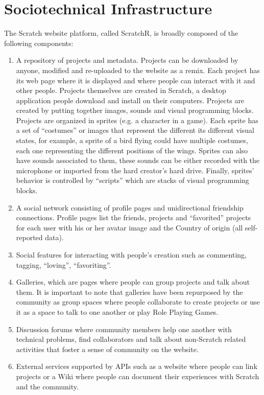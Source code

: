 \section{Sociotechnical Infrastructure}
The Scratch website platform, called ScratchR, is broadly composed of the following components: 

\begin{enumerate}
\item A repository of projects and metadata. Projects can be downloaded by anyone, modified and re-uploaded to the website as a remix. Each project has its web page where it is displayed and where people can interact with it and other people. Projects themselves are created in Scratch, a desktop application people download and install on their computers. Projects are created by putting together images, sounds and visual programming blocks. Projects are organized in sprites (e.g. a character in a game). Each sprite has a set of ``costumes'' or images that represent the different its different visual states, for example, a sprite of a bird flying could have multiple costumes, each one representing the different positions of the wings. Sprites can also have sounds associated to them, these sounds can be either recorded with the microphone or imported from the hard creator's hard drive. Finally, sprites' behavior is controlled by ``scripts'' which are stacks of visual programming blocks. 

\item A social network consisting of profile pages and unidirectional friendship connections. Profile pages list the friends, projects and ``favorited'' projects for each user with his or her avatar image and the Country of origin (all self-reported data).

\item Social features for interacting with people's creation such as commenting, tagging, ``loving'', ``favoriting''.

\item Galleries, which are pages where people can group projects and talk about them. It is important to note that galleries have been repurposed by the community as group spaces where people collaborate to create projects or use it as a space to talk to one another or play Role Playing Games.

\item Discussion forums where community members help one another with technical problems, find collaborators and talk about non-Scratch related activities that foster a sense of community on the website.

\item External services supported by APIs such as a website where people can link projects or a Wiki where people can document their experiences with Scratch and the community.
\end{enumerate}

